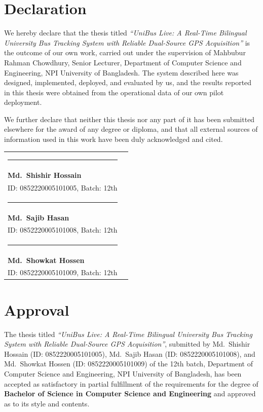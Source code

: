 \chapter*{Declaration}
\thispagestyle{plain}

We hereby declare that the thesis titled \emph{``UniBus Live: A Real-Time
Bilingual University Bus Tracking System with Reliable Dual-Source GPS
Acquisition''} is the outcome of our own work, carried out under the
supervision of Mahbubur Rahman Chowdhury, Senior Lecturer, Department of
Computer Science and Engineering, NPI University of Bangladesh. The system
described here was designed, implemented, deployed, and evaluated by us,
and the results reported in this thesis were obtained from the operational
data of our own pilot deployment.

We further declare that neither this thesis nor any part of it has been
submitted elsewhere for the award of any degree or diploma, and that all
external sources of information used in this work have been duly
acknowledged and cited.

\vspace{2.2cm}
\noindent
\begin{tabular}{@{}p{}@{}p{}@{}}
\rule{5.5cm}{0.4pt} & \\
\textbf{Md.\ Shishir Hossain} & \\
ID: 0852220005101005, Batch: 12th & \\[1.4cm]
\rule{5.5cm}{0.4pt} & \\
\textbf{Md.\ Sajib Hasan} & \\
ID: 0852220005101008, Batch: 12th & \\[1.4cm]
\rule{5.5cm}{0.4pt} & \\
\textbf{Md.\ Showkat Hossen} & \\
ID: 0852220005101009, Batch: 12th & \\
\end{tabular}
\clearpage

\chapter*{Approval}
\thispagestyle{plain}

The thesis titled \emph{``UniBus Live: A Real-Time Bilingual University
Bus Tracking System with Reliable Dual-Source GPS Acquisition''},
submitted by Md.\ Shishir Hossain (ID: 0852220005101005), Md.\ Sajib
Hasan (ID: 0852220005101008), and Md.\ Showkat Hossen (ID:
0852220005101009) of the 12th batch, Department of Computer Science and
Engineering, NPI University of Bangladesh, has been accepted as
satisfactory in partial fulfillment of the requirements for the degree
of \textbf{Bachelor of Science in Computer Science and Engineering} and
approved as to its style and contents.

